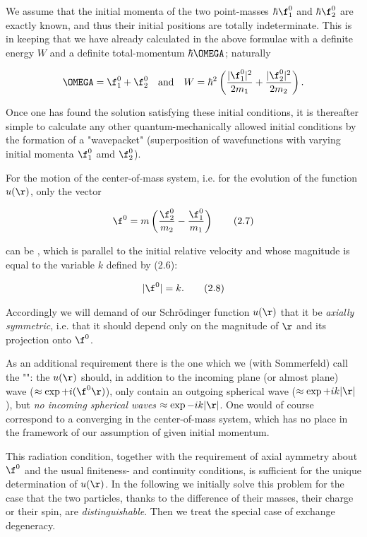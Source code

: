 \documentclass{report}
\newcommand{\nequ}[2]{
\begin{align*}
#1
\tag{#2}
\end{align*}
}
\newcommand{\uequ}[1]{
\begin{align*}
#1
\end{align*}
}
\begin{document}
We assume that the initial momenta of the two point-masses $\hbar \f^0_1$ and $\hbar \f^0_2$ are exactly known, and thus their initial positions are totally indeterminate. This is in keeping  that we have already calculated in the above formulae with a definite energy $W$ and a definite total-momentum $\hbar\OMEGA$; naturally
\uequ{
\OMEGA = \f^0_1 + \f^0_2 \quad \text{and}\quad 
W=\hbar^2\left(\frac{|\f^0_1|^2}{2m_1} + \frac{|\f^0_2|^2}{2m_2}\right).
}
Once one has found the solution satisfying these initial conditions, it is thereafter simple
to calculate any other quantum-mechanically allowed initial conditions by the formation of a "wavepacket" (superposition of wavefunctions with varying initial momenta $\f^0_1$ amd $\f^0_2$).

For the motion of the center-of-mass system, i.e. for the evolution of the function $u(\r)$, only the vector
\nequ{
\f^0 = m\left(\frac{\f^0_2}{m_2} - \frac{\f^0_1}{m_1}\right)
}{2.7}
can be , which is parallel to the initial relative velocity and whose magnitude is equal to the variable $k$ defined by (2.6):
\nequ{
|\f^0| = k.
}{2.8}
Accordingly we will demand of our Schr\"odinger function $u(\r)$ that it be \textit{axially symmetric}, i.e. that it should depend only on the magnitude of $\r$ and its projection onto $\f^0$.

As an additional requirement there is the one which we (with Sommerfeld) call the "": the 
$u(\r)$ should, in addition to the incoming plane (or almost plane) wave ($\approx \exp{+i(\f^0 \r)}$), only contain an outgoing spherical wave ($\approx \exp{+ik|\r|}$), but \textit{no incoming spherical waves} $\approx \exp{-ik|\r|}$. One would of course correspond to a converging  in the center-of-mass system, which has no place in the framework of our assumption of given initial momentum.

This radiation condition, together with the requirement of axial aymmetry about $\f^0$ and the usual finiteness- and continuity conditions, is sufficient for the unique determination of $u(\r)$. In the following we initially solve this problem for the case that the two particles, thanks to the difference of their masses, their charge or their spin, are \textit{distinguishable}. Then we treat the special case of exchange degeneracy.
\end{document}
